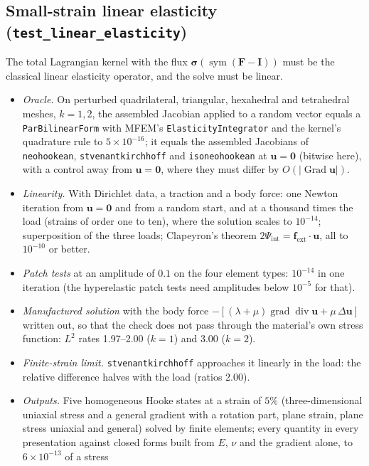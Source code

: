 \documentclass[11pt]{article}
\newcommand{\Grad}{\operatorname{Grad}}
\newcommand{\grad}{\operatorname{grad}}
\newcommand{\dive}{\operatorname{div}}
\newcommand{\sym}{\operatorname{sym}}
\newcommand{\bu}{\bm{u}}
\newcommand{\bsig}{\bm{\sigma}}
\newcommand{\bF}{\bm{F}}
\newcommand{\bI}{\bm{I}}
\DeclareRobustCommand{\code}[1]{{\def\_{\textunderscore\allowbreak}\texttt{#1}}}
\begin{document}
\subsection{Small-strain linear elasticity (\texttt{test\_linear\_elasticity})}
\label{sec:testlinear}
The total Lagrangian kernel with the flux $\bsig(\sym(\bF - \bI))$ must be
the classical linear elasticity operator, and the solve must be linear.
\begin{itemize}[nosep]
  \item \emph{Oracle.}  On perturbed quadrilateral, triangular, hexahedral
    and tetrahedral meshes, $k = 1, 2$, the assembled Jacobian applied to a
    random vector equals a \code{ParBilinearForm} with MFEM's
    \code{ElasticityIntegrator} and the kernel's quadrature rule to
    $5\times10^{-16}$; it equals the assembled Jacobians of
    \code{neo\_hookean}, \code{st\_venant\_kirchhoff} and
    \code{iso\_neo\_hookean} at $\bu = \bm 0$ (bitwise here), with a control
    away from $\bu = \bm 0$, where they must differ by $O(|\Grad\bu|)$.
  \item \emph{Linearity.}  With Dirichlet data, a traction and a body force:
    one Newton iteration from $\bu = \bm 0$ and from a random start, and at a
    thousand times the load (strains of order one to ten), where the solution
    scales to $10^{-14}$; superposition of the three loads; Clapeyron's
    theorem $2\Psi_{\mathrm{int}} = \bm f_{\mathrm{ext}}\cdot\bu$, all to
    $10^{-10}$ or better.
  \item \emph{Patch tests} at an amplitude of $0.1$ on the four element
    types: $10^{-14}$ in one iteration (the hyperelastic patch tests need
    amplitudes below $10^{-5}$ for that).
  \item \emph{Manufactured solution} with the body force
    $-[(\lambda + \mu)\grad\dive\bu + \mu\,\Delta\bu]$ written out, so that the
    check does not pass through the material's own stress function: $L^2$
    rates 1.97--2.00 ($k = 1$) and 3.00 ($k = 2$).
  \item \emph{Finite-strain limit.}  \code{st\_venant\_kirchhoff} approaches
    it linearly in the load: the relative difference halves with the load
    (ratios 2.00).
  \item \emph{Outputs.}  Five homogeneous Hooke states at a strain of $5\%$
    (three-dimensional uniaxial stress and a general gradient with a rotation
    part, plane strain, plane stress uniaxial and general) solved by finite
    elements; every quantity in every presentation against closed forms built
    from $E$, $\nu$ and the gradient alone, to $6\times10^{-13}$ of a stress

\end{itemize}
\end{document}
